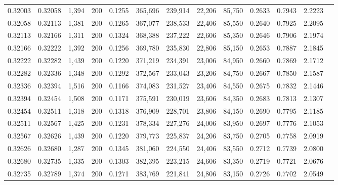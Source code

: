 \begin{tabular}{rrrrrrrrrrrrr}
0.32003 & 0.32058 &  1,394 & 200 &                                     0.1255 & 365,696 & 239,914 &  22,206 &  85,750 & 0.2633 & 0.7943 & 2.2223 \\
0.32058 & 0.32113 &  1,381 & 200 &                                     0.1265 & 367,077 & 238,533 &  22,406 &  85,550 & 0.2640 & 0.7925 & 2.2095 \\
0.32113 & 0.32166 &  1,311 & 200 &                                     0.1324 & 368,388 & 237,222 &  22,606 &  85,350 & 0.2646 & 0.7906 & 2.1974 \\
0.32166 & 0.32222 &  1,392 & 200 &                                     0.1256 & 369,780 & 235,830 &  22,806 &  85,150 & 0.2653 & 0.7887 & 2.1845 \\
0.32222 & 0.32282 &  1,439 & 200 &                                     0.1220 & 371,219 & 234,391 &  23,006 &  84,950 & 0.2660 & 0.7869 & 2.1712 \\
0.32282 & 0.32336 &  1,348 & 200 &                                     0.1292 & 372,567 & 233,043 &  23,206 &  84,750 & 0.2667 & 0.7850 & 2.1587 \\
0.32336 & 0.32394 &  1,516 & 200 &                                     0.1166 & 374,083 & 231,527 &  23,406 &  84,550 & 0.2675 & 0.7832 & 2.1446 \\
0.32394 & 0.32454 &  1,508 & 200 &                                     0.1171 & 375,591 & 230,019 &  23,606 &  84,350 & 0.2683 & 0.7813 & 2.1307 \\
0.32454 & 0.32511 &  1,318 & 200 &                                     0.1318 & 376,909 & 228,701 &  23,806 &  84,150 & 0.2690 & 0.7795 & 2.1185 \\
0.32511 & 0.32567 &  1,425 & 200 &                                     0.1231 & 378,334 & 227,276 &  24,006 &  83,950 & 0.2697 & 0.7776 & 2.1053 \\
0.32567 & 0.32626 &  1,439 & 200 &                                     0.1220 & 379,773 & 225,837 &  24,206 &  83,750 & 0.2705 & 0.7758 & 2.0919 \\
0.32626 & 0.32680 &  1,287 & 200 &                                     0.1345 & 381,060 & 224,550 &  24,406 &  83,550 & 0.2712 & 0.7739 & 2.0800 \\
0.32680 & 0.32735 &  1,335 & 200 &                                     0.1303 & 382,395 & 223,215 &  24,606 &  83,350 & 0.2719 & 0.7721 & 2.0676 \\
0.32735 & 0.32789 &  1,374 & 200 &                                     0.1271 & 383,769 & 221,841 &  24,806 &  83,150 & 0.2726 & 0.7702 & 2.0549 \\

\end{tabular}
